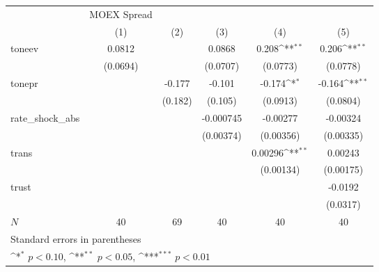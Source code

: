 {
\def\sym#1{\ifmmode^{#1}\else\(^{#1}\)\fi}
\begin{tabular}{l*{5}{c}}
\hline\hline
            & MOEX Spread         &                     &                     &                     &                     \\
            &\multicolumn{1}{c}{(1)}         &\multicolumn{1}{c}{(2)}         &\multicolumn{1}{c}{(3)}         &\multicolumn{1}{c}{(4)}         &\multicolumn{1}{c}{(5)}         \\
\hline
toneev      &      0.0812         &                     &      0.0868         &       0.208\sym{**} &       0.206\sym{**} \\
            &    (0.0694)         &                     &    (0.0707)         &    (0.0773)         &    (0.0778)         \\
[1em]
tonepr      &                     &      -0.177         &      -0.101         &      -0.174\sym{*}  &      -0.164\sym{**} \\
            &                     &     (0.182)         &     (0.105)         &    (0.0913)         &    (0.0804)         \\
[1em]
rate\_shock\_abs&                     &                     &   -0.000745         &    -0.00277         &    -0.00324         \\
            &                     &                     &   (0.00374)         &   (0.00356)         &   (0.00335)         \\
[1em]
trans       &                     &                     &                     &     0.00296\sym{**} &     0.00243         \\
            &                     &                     &                     &   (0.00134)         &   (0.00175)         \\
[1em]
trust       &                     &                     &                     &                     &     -0.0192         \\
            &                     &                     &                     &                     &    (0.0317)         \\
\hline
\(N\)       &          40         &          69         &          40         &          40         &          40         \\
\hline\hline
\multicolumn{6}{l}{\footnotesize Standard errors in parentheses}\\
\multicolumn{6}{l}{\footnotesize \sym{*} \(p<0.10\), \sym{**} \(p<0.05\), \sym{***} \(p<0.01\)}\\
\end{tabular}
}
